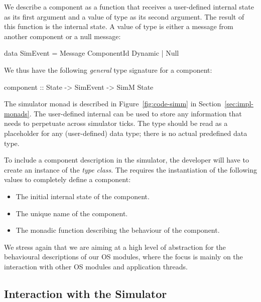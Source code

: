We describe a component as a function that receives a user-defined internal state as its first argument and a value of type  as its second argument.
The result of this function is the internal state.
A value of type  is either a message from another component or a null message:
\begin{code}
data SimEvent
  =  Message ComponentId Dynamic
  |  Null
\end{code}
We thus have the following \emph{general} type signature for a component:
\begin{code}
component :: State -> SimEvent -> SimM State
\end{code}

The simulator monad  is described in Figure~\ref{fig:code-simm} in Section~\ref{sec:impl-monads}.
The user-defined internal  can be used to store any information that needs to perpetuate across simulator ticks.
The type  should be read as a placeholder for any (user-defined) data type; there is no actual predefined  data type.

To include a component description in the simulator, the developer will have to create an instance of the  \emph{type class}.
The  requires the instantiation of the following values to completely define a component:

\begin{itemize}
  \item The initial internal state of the component.
  \item The unique name of the component.
  \item The monadic function describing the behaviour of the component.
\end{itemize}

We stress again that we are aiming at a high level of abstraction for the behavioural descriptions of our OS modules, where the focus is mainly on the interaction with other OS modules and application threads.


\subsection{Interaction with the Simulator}


